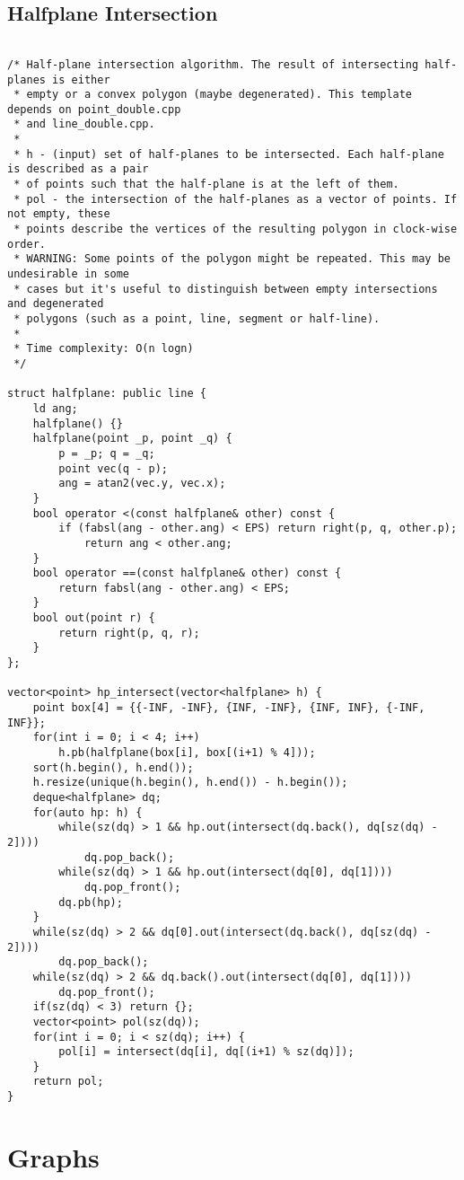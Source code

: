 \documentclass{article}
\begin{document}
\subsection{Halfplane Intersection}
\begin{verbatim}

/* Half-plane intersection algorithm. The result of intersecting half-planes is either
 * empty or a convex polygon (maybe degenerated). This template depends on point_double.cpp
 * and line_double.cpp.
 *
 * h - (input) set of half-planes to be intersected. Each half-plane is described as a pair
 * of points such that the half-plane is at the left of them.
 * pol - the intersection of the half-planes as a vector of points. If not empty, these
 * points describe the vertices of the resulting polygon in clock-wise order.
 * WARNING: Some points of the polygon might be repeated. This may be undesirable in some
 * cases but it's useful to distinguish between empty intersections and degenerated
 * polygons (such as a point, line, segment or half-line).
 *
 * Time complexity: O(n logn)
 */

struct halfplane: public line {
	ld ang;
	halfplane() {}
	halfplane(point _p, point _q) {
		p = _p; q = _q;
		point vec(q - p);
		ang = atan2(vec.y, vec.x);
	}
	bool operator <(const halfplane& other) const {
		if (fabsl(ang - other.ang) < EPS) return right(p, q, other.p);
	        return ang < other.ang;
	}
	bool operator ==(const halfplane& other) const {
		return fabsl(ang - other.ang) < EPS; 
	}
	bool out(point r) {
		return right(p, q, r);
	}
};

vector<point> hp_intersect(vector<halfplane> h) {
	point box[4] = {{-INF, -INF}, {INF, -INF}, {INF, INF}, {-INF, INF}};
	for(int i = 0; i < 4; i++)
		h.pb(halfplane(box[i], box[(i+1) % 4]));
	sort(h.begin(), h.end());
	h.resize(unique(h.begin(), h.end()) - h.begin());
	deque<halfplane> dq;
	for(auto hp: h) {
		while(sz(dq) > 1 && hp.out(intersect(dq.back(), dq[sz(dq) - 2])))
			dq.pop_back();
		while(sz(dq) > 1 && hp.out(intersect(dq[0], dq[1])))
			dq.pop_front();
		dq.pb(hp);
	}
	while(sz(dq) > 2 && dq[0].out(intersect(dq.back(), dq[sz(dq) - 2])))
		dq.pop_back();
	while(sz(dq) > 2 && dq.back().out(intersect(dq[0], dq[1])))
		dq.pop_front();
	if(sz(dq) < 3) return {};
	vector<point> pol(sz(dq));
	for(int i = 0; i < sz(dq); i++) {
		pol[i] = intersect(dq[i], dq[(i+1) % sz(dq)]);
	}
	return pol;
}
\end{verbatim}
\section{Graphs}
\end{document}
